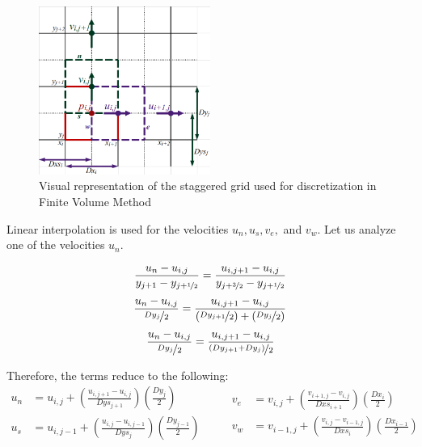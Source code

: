 \documentclass[12pt,a4paper,fleqn]{article}
\begin{document}
\begin{figure}[H]
    \centering
    \includegraphics[width=0.5\textwidth]{staggered_grid.png}
    \caption{Visual representation of the staggered grid used for discretization in Finite Volume Method}
    \label{fig:staggered-grid}
\end{figure}

Linear interpolation is used for the velocities \(u_n, u_s, v_e,\) and \(v_w\). Let us analyze one of the velocities \(u_n\).

\begin{equation*}
\frac{u_n - u_{i,j}}{y_{j+1} - y_{j+\nicefrac{1}{2}}}
= \frac{u_{i,j+1} - u_{i,j}}{y_{j+\nicefrac{3}{2}} - y_{j+\nicefrac{1}{2}}}
\end{equation*}
\begin{equation*}
\frac{u_n - u_{i,j}}{\nicefrac{Dy_j}{2}}
= \frac{u_{i,j+1} - u_{i,j}}
{\left(\nicefrac{Dy_{j+1}}{2}\right) + \left(\nicefrac{Dy_j}{2}\right)}
\end{equation*}
\begin{equation*}
\frac{u_n - u_{i,j}}{\nicefrac{Dy_j}{2}}
= \frac{u_{i,j+1} - u_{i,j}}
{\nicefrac{\left(Dy_{j+1} +Dy_j\right)}{2}}
\end{equation*}

Therefore, the terms reduce to the following:
\begin{equation*}
\begin{aligned}
u_n &= u_{i,j} + \left(\frac{u_{i,j+1} - u_{i,j}}{Dys_{j+1}}\right)
\left(\frac{Dy_j}{2}\right)\\
u_s &= u_{i,j-1} + \left(\frac{u_{i,j} - u_{i,j-1}}{Dys_j}\right)
\left(\frac{Dy_{j-1}}{2}\right)
\end{aligned}
\qquad
\begin{aligned}
v_e &= v_{i,j} + \left(\frac{v_{i+1,j} - v_{i,j}}{Dxs_{i+1}}\right)
\left(\frac{Dx_i}{2}\right)\\
v_w &= v_{i-1,j} + \left(\frac{v_{i,j} - v_{i-1,j}}{Dxs_i}\right)
\left(\frac{Dx_{i-1}}{2}\right)
\end{aligned}
\end{equation*}
\end{document}
